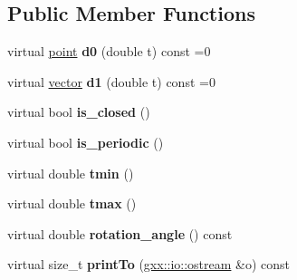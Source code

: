 \subsection*{Public Member Functions}
\begin{DoxyCompactItemize}
\item 
virtual \hyperlink{classmalgo_1_1vector2}{point} {\bfseries d0} (double t) const =0\hypertarget{classgxx_1_1geom2_1_1curve_a66cb70e2231790cfad01ccbde44e5386}{}\label{classgxx_1_1geom2_1_1curve_a66cb70e2231790cfad01ccbde44e5386}

\item 
virtual \hyperlink{classmalgo_1_1vector2}{vector} {\bfseries d1} (double t) const =0\hypertarget{classgxx_1_1geom2_1_1curve_a9420622691b23230d2abb55053892253}{}\label{classgxx_1_1geom2_1_1curve_a9420622691b23230d2abb55053892253}

\item 
virtual bool {\bfseries is\+\_\+closed} ()\hypertarget{classgxx_1_1geom2_1_1curve_a2a66df08c2ea61834f4f3c4a534d4486}{}\label{classgxx_1_1geom2_1_1curve_a2a66df08c2ea61834f4f3c4a534d4486}

\item 
virtual bool {\bfseries is\+\_\+periodic} ()\hypertarget{classgxx_1_1geom2_1_1curve_ab5c6e8656bb94e707347ef759f16e983}{}\label{classgxx_1_1geom2_1_1curve_ab5c6e8656bb94e707347ef759f16e983}

\item 
virtual double {\bfseries tmin} ()\hypertarget{classgxx_1_1geom2_1_1curve_a373183153d480ef8d9b07902f1ace1a1}{}\label{classgxx_1_1geom2_1_1curve_a373183153d480ef8d9b07902f1ace1a1}

\item 
virtual double {\bfseries tmax} ()\hypertarget{classgxx_1_1geom2_1_1curve_a8d471bd51d4cdc60f149be693214fb5a}{}\label{classgxx_1_1geom2_1_1curve_a8d471bd51d4cdc60f149be693214fb5a}

\item 
virtual double {\bfseries rotation\+\_\+angle} () const \hypertarget{classgxx_1_1geom2_1_1curve_a26efbda8dcf5d280a173f19c65d841c0}{}\label{classgxx_1_1geom2_1_1curve_a26efbda8dcf5d280a173f19c65d841c0}

\item 
virtual size\+\_\+t {\bfseries print\+To} (\hyperlink{classgxx_1_1io_1_1ostream}{gxx\+::io\+::ostream} \&o) const \hypertarget{classgxx_1_1geom2_1_1curve_a7b2b797ae4e46c0f8d8afd34fa96b7b2}{}\label{classgxx_1_1geom2_1_1curve_a7b2b797ae4e46c0f8d8afd34fa96b7b2}


\end{DoxyCompactItemize}
